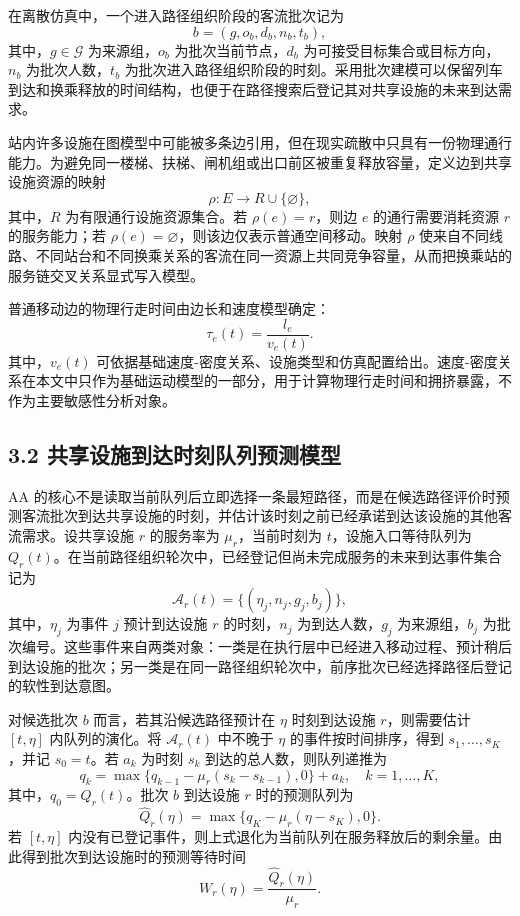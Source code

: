 \documentclass[UTF8,a4paper,12pt]{ctexart}
\begin{document}
在离散仿真中，一个进入路径组织阶段的客流批次记为
\[
b=(g,o_b,d_b,n_b,t_b),
\]
其中，\(g\in\mathcal{G}\) 为来源组，\(o_b\) 为批次当前节点，\(d_b\) 为可接受目标集合或目标方向，\(n_b\) 为批次人数，\(t_b\) 为批次进入路径组织阶段的时刻。采用批次建模可以保留列车到达和换乘释放的时间结构，也便于在路径搜索后登记其对共享设施的未来到达需求。

站内许多设施在图模型中可能被多条边引用，但在现实疏散中只具有一份物理通行能力。为避免同一楼梯、扶梯、闸机组或出口前区被重复释放容量，定义边到共享设施资源的映射
\[
\rho:E\rightarrow R\cup\{\varnothing\},
\]
其中，\(R\) 为有限通行设施资源集合。若 \(\rho(e)=r\)，则边 \(e\) 的通行需要消耗资源 \(r\) 的服务能力；若 \(\rho(e)=\varnothing\)，则该边仅表示普通空间移动。映射 \(\rho\) 使来自不同线路、不同站台和不同换乘关系的客流在同一资源上共同竞争容量，从而把换乘站的服务链交叉关系显式写入模型。

普通移动边的物理行走时间由边长和速度模型确定：
\[
\tau_e(t)=\frac{l_e}{v_e(t)}.
\]
其中，\(v_e(t)\) 可依据基础速度-密度关系、设施类型和仿真配置给出。速度-密度关系在本文中只作为基础运动模型的一部分，用于计算物理行走时间和拥挤暴露，不作为主要敏感性分析对象。

\subsection{3.2 共享设施到达时刻队列预测模型}

AA 的核心不是读取当前队列后立即选择一条最短路径，而是在候选路径评价时预测客流批次到达共享设施的时刻，并估计该时刻之前已经承诺到达该设施的其他客流需求。设共享设施 \(r\) 的服务率为 \(\mu_r\)，当前时刻为 \(t\)，设施入口等待队列为 \(Q_r(t)\)。在当前路径组织轮次中，已经登记但尚未完成服务的未来到达事件集合记为
\[
\mathcal{A}_r(t)=\{(\eta_j,n_j,g_j,b_j)\},
\]
其中，\(\eta_j\) 为事件 \(j\) 预计到达设施 \(r\) 的时刻，\(n_j\) 为到达人数，\(g_j\) 为来源组，\(b_j\) 为批次编号。这些事件来自两类对象：一类是在执行层中已经进入移动过程、预计稍后到达设施的批次；另一类是在同一路径组织轮次中，前序批次已经选择路径后登记的软性到达意图。

对候选批次 \(b\) 而言，若其沿候选路径预计在 \(\eta\) 时刻到达设施 \(r\)，则需要估计 \([t,\eta]\) 内队列的演化。将 \(\mathcal{A}_r(t)\) 中不晚于 \(\eta\) 的事件按时间排序，得到 \(s_1,\ldots,s_K\)，并记 \(s_0=t\)。若 \(a_k\) 为时刻 \(s_k\) 到达的总人数，则队列递推为
\[
q_k=\max\{q_{k-1}-\mu_r(s_k-s_{k-1}),0\}+a_k,\quad k=1,\ldots,K,
\]
其中，\(q_0=Q_r(t)\)。批次 \(b\) 到达设施 \(r\) 时的预测队列为
\[
\widehat Q_r(\eta)=\max\{q_K-\mu_r(\eta-s_K),0\}.
\]
若 \([t,\eta]\) 内没有已登记事件，则上式退化为当前队列在服务释放后的剩余量。由此得到批次到达设施时的预测等待时间
\[
W_r(\eta)=\frac{\widehat Q_r(\eta)}{\mu_r}.
\]
\end{document}
